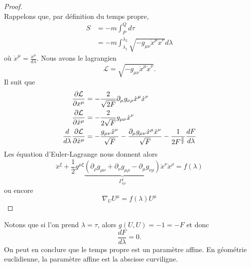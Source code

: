 \documentclass[a4paper,11pt]{report}
\theoremstyle{definition}
\theoremstyle{plain}
\theoremstyle{definition}
\theoremstyle{remark}
\newcommand{\p}{\partial}
\begin{document}
            \begin{proof}${}$\\
                Rappelons que, par définition du temps propre,
                \begin{align}
                    S &= -m\int_P^Q d\tau\\
                    &= -m\int_{\lambda_1}^{\lambda_2}\sqrt{-g_{\mu\nu}\dot{x}^\mu\dot{x}^\nu}d\lambda
                \end{align}
                où $\dot{x}^\mu = \frac{x^\mu}{d\lambda}$. Nous avons le lagrangien
                \begin{equation}
                    \mathcal{L} = \sqrt{-g_{\mu\nu}\dot{x}^\mu\dot{x}^\nu}.
                \end{equation}
                Il suit que
                \begin{align}
                    \pdv{\mathcal{L}}{x^\mu} &= -\frac{2}{\sqrt{2F}}\p_\mu g_{\nu\rho}\dot{x}^\mu\dot{x}^\nu \\
                    \pdv{\mathcal{L}}{\dot{x}^\mu} &= -\frac{2}{2\sqrt{F}}g_{\mu\nu}\dot{x}^\nu\\
                    \frac{d}{d\lambda}\pdv{\mathcal{L}}{\dot{x}^\mu} &= -\frac{g_{\mu\nu}\ddot{x}^\nu}{\sqrt{F}}-\frac{\p_\mu g_{\mu\nu} \dot{x}^\mu\dot{x}^\nu}{\sqrt{F}}-\frac{1}{2F^{\frac{3}{2}}}\frac{dF}{d\lambda}
                \end{align}
                Les équation d'Euler-Lagrange nous donnent alors
                \begin{equation}
                    \ddot{x}^\xi + \frac{1}{2}g^{\mu\xi}\underbrace{\left( \p_\rho g_{\mu\nu}+\p_\nu g_{\mu\rho} - \p_\mu g_{\nu\rho} \right)}_{\Gamma^\xi_{\nu\rho}}\dot{x}^\nu\dot{x}^\rho = f(\lambda)
                \end{equation}
                ou encore
                \begin{equation}
                    \nabla_U U^\mu = f(\lambda)U^\mu
                \end{equation}
            \end{proof}
            
            Notons que si l'on prend $\lambda = \tau$, alors $g(U,U) = -1 = -F$ et donc
            \begin{equation}
                \frac{dF}{d\lambda} = 0.
            \end{equation}
            On peut en conclure que le temps propre est un paramètre affine. En géométrie euclidienne, la paramètre affine est la abscisse curviligne.
            
\end{document}
